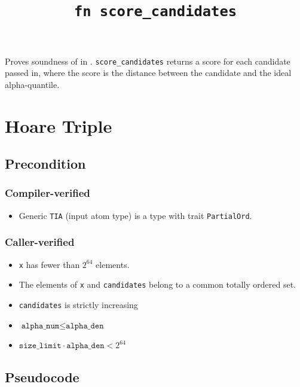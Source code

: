 \documentclass{article}
\title{\texttt{fn score\_candidates}}
\author{\MichaelShoemateAuthor}
\begin{document}
\maketitle


\contrib

Proves soundness of 
in .
\texttt{score\_candidates} returns a score for each candidate passed in,
where the score is the distance between the candidate and the ideal alpha-quantile.

\section{Hoare Triple}
\subsection*{Precondition}
\subsubsection*{Compiler-verified}
\begin{itemize}
    \item Generic \texttt{TIA} (input atom type) is a type with trait \texttt{PartialOrd}.
\end{itemize}

\subsubsection*{Caller-verified}
\begin{itemize}
    \item \texttt{x} has fewer than $2^{64}$ elements.
    \item The elements of \texttt{x} and \texttt{candidates} belong to a common totally ordered set.
    \item \texttt{candidates} is strictly increasing
    \item $\texttt{alpha\_num} \le \texttt{alpha\_den}$
    \item $\texttt{size\_limit} \cdot \texttt{alpha\_den} < 2^{64}$
\end{itemize}


\subsection*{Pseudocode}
\label{sec:python-pseudocode}

\end{document}
